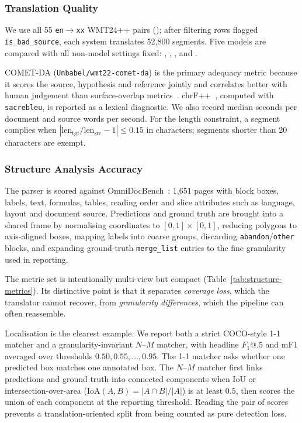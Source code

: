 \subsubsection{Translation Quality}
\label{subsubsec:eval-mt}

We use all 55 \texttt{en}$\rightarrow$\texttt{xx} WMT24++ pairs
(\citealp{wmt24pp}); after filtering rows flagged \texttt{is\_bad\_source},
each system translates 52{,}800 segments. Five models are compared with all
non-model settings fixed:
\texttt{},
\texttt{},
\texttt{}, \texttt{} and
\texttt{}.

COMET-DA (\texttt{Unbabel/wmt22-comet-da}) is the primary adequacy metric because
it scores the source, hypothesis and reference jointly and correlates better
with human judgement than surface-overlap metrics~\citep{comet,wmt-metrics-shared-task}.
chrF++~\citep{chrf}, computed with \texttt{sacrebleu}, is reported as a lexical
diagnostic. We also record median seconds per document and source words per
second. For the length constraint, a segment complies when
$|\text{len}_{\text{tgt}}/\text{len}_{\text{src}} - 1| \le 0.15$ in characters;
segments shorter than 20 characters are exempt.

\subsubsection{Structure Analysis Accuracy}
\label{subsubsec:eval-parser}

The parser is scored against OmniDocBench~\citep{omnidocbench}: 1{,}651 pages
with block boxes, labels, text, formulas, tables, reading order and slice
attributes such as language, layout and document source. Predictions and ground
truth are brought into a shared frame by normalising coordinates to
$[0,1]\times[0,1]$, reducing polygons to axis-aligned boxes, mapping labels into
coarse groups, discarding \texttt{abandon}/\texttt{other} blocks, and expanding
ground-truth \texttt{merge\_list} entries to the fine granularity used in
reporting.

The metric set is intentionally multi-view but compact (Table~\ref{tab:structure-metrics}).
Its distinctive point is that it separates \emph{coverage loss}, which the
translator cannot recover, from \emph{granularity differences}, which the
pipeline can often reassemble.

Localisation is the clearest example. We report both a strict COCO-style 1-1
matcher and a granularity-invariant $N$--$M$ matcher, with headline $F_1@.5$ and
mF1 averaged over thresholds $0.50,0.55,\dots,0.95$. The 1-1 matcher asks
whether one predicted box matches one annotated box. The $N$--$M$ matcher first
links predictions and ground truth into connected components when IoU or
intersection-over-area ($\mathrm{IoA}(A,B)=|A\cap B|/|A|$) is at least $0.5$,
then scores the union of each
component at the reporting threshold. Reading the pair of scores prevents a
translation-oriented split from being counted as pure detection loss.

